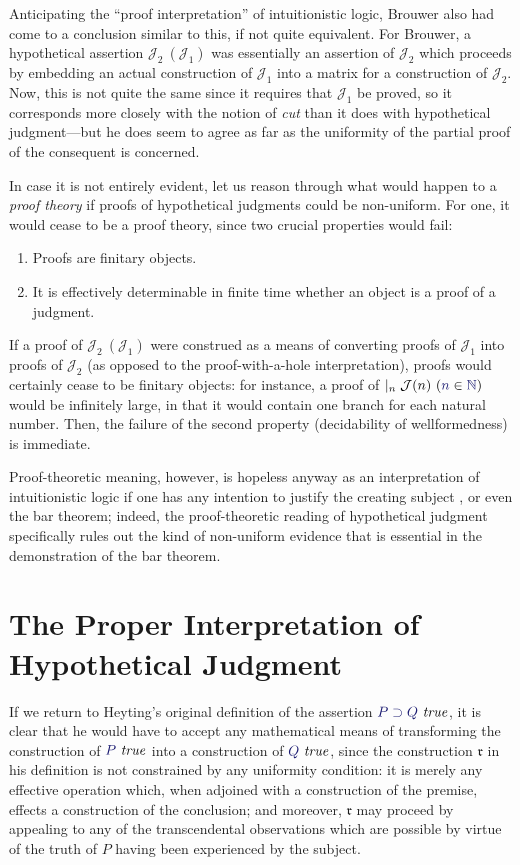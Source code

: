 \documentclass[11pt]{amsart}
\theoremstyle{definition}
\theoremstyle{remark}
\numberwithin{equation}{section}
\def\InputModeColorName{MidnightBlue}
\newcommand\InputMode[1]{{\color{\InputModeColorName}{#1}}}
\newcommand\HypJ[2]{#1\ (#2)}
\newcommand\GenJ[2]{\vert_{#1}\; #2}
\newcommand\JJ{\mathcal{J}}
\newcommand\IsTrue[1]{\InputMode{#1}\ \mathit{true}}
\newcommand\Member[2]{\InputMode{#1}\in \InputMode{#2}}
\newcommand\Nat{\mathbb{N}}
\newcommand\Imp[2]{#1\supset #2}
\begin{document}
Anticipating the ``proof interpretation'' of intuitionistic logic, Brouwer also
had come to a conclusion similar to this, if not quite equivalent. For Brouwer,
a hypothetical assertion $\HypJ{\JJ_2}{\JJ_1}$ was essentially an assertion of
$\JJ_2$ which proceeds by embedding an actual construction of $\JJ_1$ into a
matrix for a construction of $\JJ_2$. Now, this is not quite the same since it
requires that $\JJ_1$ be proved, so it corresponds more closely with the notion
of \emph{cut} than it does with hypothetical judgment---but he does seem to
agree as far as the uniformity of the partial proof of the consequent is
concerned.

In case it is not entirely evident, let us reason through what would happen to a
\emph{proof theory} if proofs of hypothetical judgments could be non-uniform.
For one, it would cease to be a proof theory, since two crucial properties would
fail:

\begin{enumerate}
  \item Proofs are finitary objects.
  \item It is effectively determinable in finite time whether an object is
    a proof of a judgment.
\end{enumerate}

If a proof of $\HypJ{\JJ_2}{\JJ_1}$ were construed as a means of converting
proofs of $\JJ_1$ into proofs of $\JJ_2$ (as opposed to the proof-with-a-hole
interpretation), proofs would certainly cease to be finitary objects: for
instance, a proof of $\GenJ{n}{\HypJ{\JJ(n)}{\Member{n}{\Nat}}}$ would be
infinitely large, in that it would contain one branch for each natural number.
Then, the failure of the second property (decidability of wellformedness) is
immediate.

Proof-theoretic meaning, however, is hopeless anyway as an interpretation of
intuitionistic logic if one has any intention to justify the creating subject
\cite{mva:personal}, or even the bar theorem; indeed, the proof-theoretic
reading of hypothetical judgment specifically rules out the kind of non-uniform
evidence that is essential in the demonstration of the bar theorem.

\section{The Proper Interpretation of Hypothetical Judgment}

If we return to Heyting's original definition of the assertion
$\IsTrue{\Imp{P}{Q}}$, it is clear that he would have to accept any mathematical
means of transforming the construction of $\IsTrue{P}$ into a construction of
$\IsTrue{Q}$, since the construction $\mathfrak{r}$ in his definition is not
constrained by any uniformity condition: it is merely any effective operation
which, when adjoined with a construction of the premise, effects a construction
of the conclusion; and moreover, $\mathfrak{r}$ may proceed by appealing to any
of the transcendental observations which are possible by virtue of the truth of
$P$ having been experienced by the subject.
\end{document}
